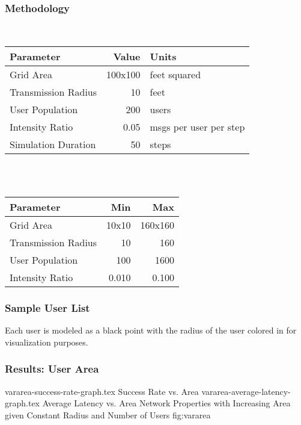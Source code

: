 \begin{frame}
    \frametitle{Methodology}
    \centering
    \\[0.25cm]
    \begin{tabular}{l|rl}
        \hline
        Parameter               & Value     & Units                     \\
        \hline
        Grid Area               & 100x100   & feet squared              \\
        Transmission Radius     & 10        & feet                      \\
        User Population         & 200       & users                     \\
        \hline
        Intensity Ratio         & 0.05      & msgs per user per step    \\
        Simulation Duration     & 50        & steps                     \\
        \hline
    \end{tabular}\\[0.5cm]
    
    \\[0.25cm]
    \begin{tabular}{l|rr}
        \hline
        Parameter               & Min   & Max       \\
        \hline
        Grid Area               & 10x10 & 160x160   \\
        Transmission Radius     & 10    & 160       \\
        User Population         & 100   & 1600      \\
        \hline
        Intensity Ratio         & 0.010 & 0.100     \\
        \hline
    \end{tabular}

\end{frame}

\begin{frame}
    \frametitle{Sample User List}
    \begin{center}
    \resizebox{.7\textwidth}{!}{}
    \end{center}
    
    Each user is modeled as a black point with the radius of the user colored in
    for visualization purposes.

\end{frame}

\begin{frame}
    \frametitle{Results: User Area}
\sidebysidefigures
{vararea-success-rate-graph.tex}       {Success Rate vs. Area}
{vararea-average-latency-graph.tex}    {Average Latency vs. Area}
{Network Properties with Increasing Area given Constant Radius and Number of Users}
{fig:vararea}

\end{frame}

